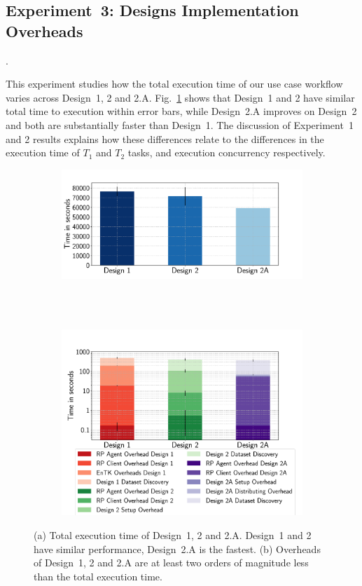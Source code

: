 \subsection{Experiment~3: Designs Implementation Overheads}\label{ssec:exp3}. 

This experiment studies how the total execution time of our use case workflow
varies across Design~1, 2 and 2.A. Fig.~\ref{fig:ttx} shows that Design~1 and
2 have similar total time to execution within error bars, while Design~2.A
improves on Design~2 and both are substantially faster than Design~1. The
discussion of Experiment~1 and 2 results explains how these differences
relate to the differences in the execution time of $T_{1}$ and $T_{2}$ tasks,
and execution concurrency respectively.

\begin{figure}[ht!]
	\centering
	\begin{subfigure}{0.95\textwidth}
		\includegraphics[width=\linewidth]{figures/designs/ttx.pdf}
		\caption{}
		\label{fig:ttx}
	\end{subfigure}\\
	~
	\begin{subfigure}{0.95\textwidth}
		\includegraphics[width=\linewidth]{figures/designs/overheads.pdf}
		\caption{}
		\label{fig:overheads}
	\end{subfigure}
	\caption{(a) Total execution time of Design~1, 2 and 2.A. Design~1 and 2
		have similar performance, Design~2.A is the fastest. (b) Overheads of
		Design~1, 2 and 2.A are at least two orders of magnitude less than the
		total execution time.}\label{fig:overall_performance}
\end{figure}


